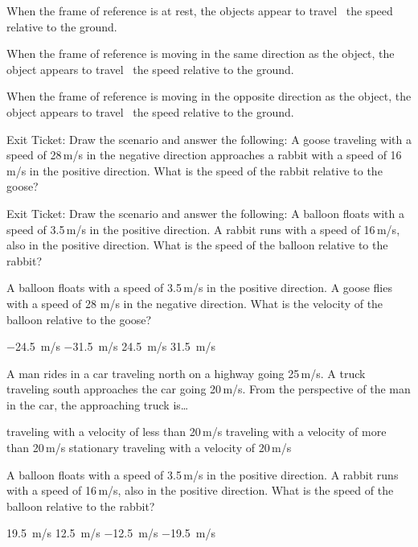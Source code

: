 \documentclass[]{exam}
\begin{document}
\begin{questions}
\question
When the frame of reference is at rest, the objects appear to travel \fillin[equal to]\ the speed relative to the ground.

\question
When the frame of reference is moving in the same direction as the object, the object appears to travel \ the speed relative to the ground.

\question
When the frame of reference is moving in the opposite direction as the object, the object appears to travel \ the speed relative to the ground.

\question
Exit Ticket: Draw the scenario and answer the following: A goose traveling with a speed of 28\,m/s in the negative direction approaches a rabbit with a speed of 16\,m/s in the positive direction. What is the speed of the rabbit relative to the goose?

\question
Exit Ticket:  Draw the scenario and answer the following: A balloon floats with a speed of 3.5\,m/s in the positive direction.  A rabbit runs with a speed of 16\,m/s, also in the positive direction.  What is the speed of the balloon relative to the rabbit?


\question
A balloon floats with a speed of 3.5\,m/s in the positive direction.  A goose flies with a speed of 28 m/s in the negative direction. What is the velocity of the balloon relative to the goose?

\begin{randomizechoices}
    \choice \SI{-24.5}{m/s}
    \choice \SI{-31.5}{m/s}
    \choice \SI{24.5}{m/s}
    \correctchoice \SI{31.5}{m/s}
\end{randomizechoices}

\question
A man rides in a car traveling north on a highway going 25\,m/s. A truck traveling south approaches the car going 20\,m/s. From the perspective of the man in the car, the approaching truck is\dots

\begin{randomizechoices}
    \choice traveling with a velocity of less than 20\,m/s
    \choice traveling with a velocity of more than 20\,m/s
    \choice stationary
    \choice traveling with a velocity of 20\,m/s
\end{randomizechoices}

\question
A balloon floats with a speed of 3.5\,m/s in the positive direction. A rabbit runs with a speed of 16\,m/s, also in the positive direction. What is the speed of the balloon relative to the rabbit?

\begin{randomizechoices}
    \choice \SI{19.5}{m/s}
    \choice \SI{12.5}{m/s}
    \correctchoice \SI{-12.5}{m/s}
    \choice \SI{-19.5}{m/s}
\end{randomizechoices}


\end{questions}
\end{document}
